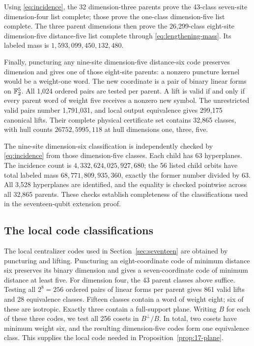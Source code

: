 Using \eqref{eq:incidence}, the 32 dimension-three parents prove the
43-class seven-site dimension-four list complete; those prove the
one-class dimension-five list complete. The three parent dimensions
then prove the 26,299-class eight-site dimension-five distance-five list
complete through \eqref{eq:lengthening-mass}. Its labeled mass is
\(1,593,099,450,132,480\).

Finally, puncturing any nine-site dimension-five distance-six code
preserves dimension and gives one of those eight-site parents: a
nonzero puncture kernel would be a weight-one word. The new coordinate
is a pair of binary linear forms on \(\mathbb F_2^5\). All 1,024 ordered pairs
are tested per parent. A lift is valid if and only if every parent word
of weight five receives a nonzero new symbol. The unrestricted valid
pairs number 1,791,031, and local output equivalence gives 299,175
canonical lifts. Their complete physical certificate set contains
32,865 classes, with hull counts \(26752,5995,118\) at hull dimensions
one, three, five.

The nine-site dimension-six classification is independently checked by
\eqref{eq:incidence} from those dimension-five classes. Each child has
63 hyperplanes. The incidence count is
\(4,332,624,025,927,680\); the 56 listed child orbits have total labeled
mass \(68,771,809,935,360\), exactly the former number divided by 63.
All 3,528 hyperplanes are identified, and the equality is checked
pointwise across all 32,865 parents. These checks establish completeness of the classifications used in the
seventeen-qubit extension proof.

\subsection{The local code classifications}\label{sec:local-classifications}

The local centralizer codes used in Section~\ref{sec:seventeen} are
obtained by puncturing and lifting. Puncturing an eight-coordinate code of minimum
distance six preserves its binary dimension and gives a seven-coordinate
code of minimum distance at least five. For dimension four, the 43 parent
classes above suffice. Testing all \(2^8=256\) ordered pairs
of linear forms per parent gives 861 valid lifts and 28 equivalence
classes. Fifteen classes contain a word of weight eight; six of these
are isotropic. Exactly three contain a full-support plane. Writing
\(B\) for each of these three codes, we test all 256 cosets in
\(B^\perp/B\). In total, two cosets have
minimum weight six, and the resulting dimension-five codes form one
equivalence class. This supplies the local code needed in
Proposition~\ref{prop:17-plane}.

